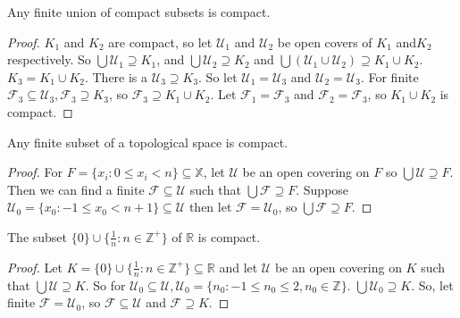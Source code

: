 \documentclass{article}
\begin{document}
	\begin{theorem}
	  Any finite union of compact subsets is compact.
	\end{theorem}

	\begin{proof}
	$K_1$ and $K_2$ are compact, so let $\mathcal{U}_1$ and $\mathcal{U}_2$ be open covers of $K_1$ and$K_2$ respectively. So $\bigcup \mathcal{U}_1 \supseteq K_1$, and $\bigcup \mathcal{U}_2 \supseteq K_2$ and $\bigcup (\mathcal{U}_1 \cup \mathcal{U}_2) \supseteq K_1 \cup K_2$. $K_3 = K_1 \cup K_2$. There is a $\mathcal{U}_3 \supseteq K_3$. So let $\mathcal{U}_1 = \mathcal{U}_3$ and $\mathcal{U}_2 = \mathcal{U}_3$. For finite $\mathcal{F}_3 \subseteq \mathcal{U}_3, \mathcal{F}_3 \supseteq K_3$, so $\mathcal{F}_3 \supseteq K_1 \cup K_2$. Let $\mathcal{F}_1 = \mathcal{F}_3$ and $\mathcal{F}_2 = \mathcal{F}_3$, so $K_1 \cup K_2$ is compact.
	\end{proof}

	\begin{proposition}
	  Any finite subset of a topological space is compact.
	\end{proposition}

	\begin{proof}
	For $F = \lbrace x_i : 0 \leq x_i < n \rbrace \subseteq \mathbb{X}$, let $\mathcal{U}$ be an open covering on $F$ so $\bigcup \mathcal{U} \supseteq F$. Then we can find  a finite $\mathcal{F} \subseteq \mathcal{U}$ such that $\bigcup \mathcal{F} \supseteq F$. Suppose $\mathcal{U}_0 = \lbrace x_0 : -1 \leq x_0 < n+1 \rbrace \subseteq \mathcal{U}$ then let $\mathcal{F} = \mathcal{U}_0$, so $\bigcup \mathcal{F} \supseteq F$.
	\end{proof}

	\begin{proposition}
	  The subset \(\{0\}\cup\{\frac{1}{n}:n\in\mathbb Z^+\}\) of \(\mathbb R\) is compact.
	\end{proposition}

	\begin{proof}
	Let $K = \lbrace 0 \rbrace \cup \lbrace \frac{1}{n} : n \in \mathbb{Z^+} \rbrace \subseteq \mathbb{R}$ and let $\mathcal{U}$ be an open covering on $K$ such that $\bigcup \mathcal{U} \supseteq K$. So for $\mathcal{U}_0 \subseteq \mathcal{U}, \mathcal{U}_0 = \lbrace n_0 : -1 \leq n_0 \leq 2, n_0 \in \mathbb{Z} \rbrace$. $\bigcup \mathcal{U}_0 \supseteq K$. So, let finite $\mathcal{F} = \mathcal{U}_0$, so $\mathcal{F} \subseteq \mathcal{U}$ and $\mathcal{F} \supseteq K$.
	\end{proof}
\end{document}
